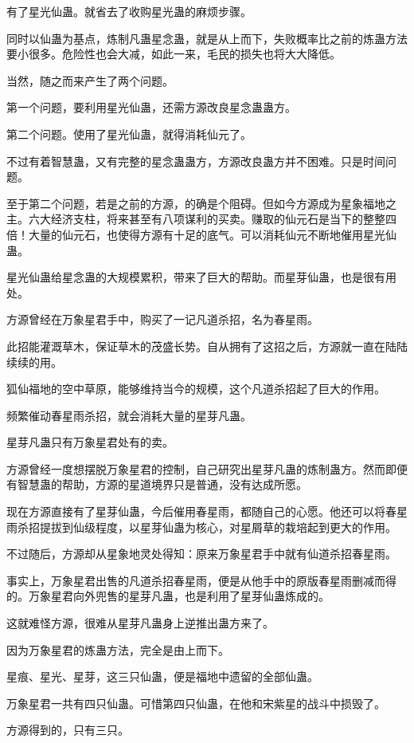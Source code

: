 \begin{this_body}
有了星光仙蛊。就省去了收购星光蛊的麻烦步骤。

同时以仙蛊为基点，炼制凡蛊星念蛊，就是从上而下，失败概率比之前的炼蛊方法要小很多。危险性也会大减，如此一来，毛民的损失也将大大降低。

当然，随之而来产生了两个问题。

第一个问题，要利用星光仙蛊，还需方源改良星念蛊蛊方。

第二个问题。使用了星光仙蛊，就得消耗仙元了。

不过有着智慧蛊，又有完整的星念蛊蛊方，方源改良蛊方并不困难。只是时间问题。

至于第二个问题，若是之前的方源，的确是个阻碍。但如今方源成为星象福地之主。六大经济支柱，将来甚至有八项谋利的买卖。赚取的仙元石是当下的整整四倍！大量的仙元石，也使得方源有十足的底气。可以消耗仙元不断地催用星光仙蛊。

星光仙蛊给星念蛊的大规模累积，带来了巨大的帮助。而星芽仙蛊，也是很有用处。

方源曾经在万象星君手中，购买了一记凡道杀招，名为春星雨。

此招能灌溉草木，保证草木的茂盛长势。自从拥有了这招之后，方源就一直在陆陆续续的用。

狐仙福地的空中草原，能够维持当今的规模，这个凡道杀招起了巨大的作用。

频繁催动春星雨杀招，就会消耗大量的星芽凡蛊。

星芽凡蛊只有万象星君处有的卖。

方源曾经一度想摆脱万象星君的控制，自己研究出星芽凡蛊的炼制蛊方。然而即便有智慧蛊的帮助，方源的星道境界只是普通，没有达成所愿。

现在方源直接有了星芽仙蛊，今后催用春星雨，都随自己的心愿。他还可以将春星雨杀招提拔到仙级程度，以星芽仙蛊为核心，对星屑草的栽培起到更大的作用。

不过随后，方源却从星象地灵处得知：原来万象星君手中就有仙道杀招春星雨。

事实上，万象星君出售的凡道杀招春星雨，便是从他手中的原版春星雨删减而得的。万象星君向外兜售的星芽凡蛊，也是利用了星芽仙蛊炼成的。

这就难怪方源，很难从星芽凡蛊身上逆推出蛊方来了。

因为万象星君的炼蛊方法，完全是由上而下。

星痕、星光、星芽，这三只仙蛊，便是福地中遗留的全部仙蛊。

万象星君一共有四只仙蛊。可惜第四只仙蛊，在他和宋紫星的战斗中损毁了。

方源得到的，只有三只。


\end{this_body}
